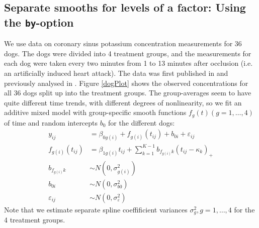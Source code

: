 \documentclass[12pt]{article}
\newcommand{\eps}{\varepsilon}
\newcommand{\sigmaeps} {\sigma^2_{\eps}}
\begin{document}
\clearpage
\subsection{Separate smooths for levels of a factor: Using the \texttt{by}-option}\label{ExBy}
We use data on coronary sinus potassium concentration measurements for 36 dogs.
The dogs were divided into 4 treatment groups, and the measurements for each dog
were taken every two minutes from 1 to 13 minutes after occlusion (i.e. an
artificially induced heart attack). The data was first published in
\cite{Grizzle:1969} and previously analysed in \cite{Crainiceanu:2005}. Figure
\ref{dogPlot} shows the observed concentrations for all 36 dogs split up into the
treatment groups. The group-averages seem to have quite different time trends,
with different degrees of nonlinearity, so we fit an additive mixed model with
group-specific smooth functions $f_{g}(t) (g=1,\dots,4)$ of time and random
intercepts $b_0$ for the different dogs:
\begin{align*}
y_{ij} &= \beta_{0g(i)} +  f_{g(i)}(t_{ij}) + b_{0i} + \eps_{ij}\\
f_{g(i)}(t_{ij}) &= \beta_{1g(i)} t_{ij} + \sum_{k=1}^{K-1} b_{f_{g(i)}k}(t_{ij}- \kappa_k)_+ \\
b_{f_{g(i)}k} &\sim N(0, \sigma^2_{g(i)}) \\
b_{0i} &\sim N(0, \sigma^2_{b0}) \\
\eps_{ij} &\sim N(0, \sigmaeps) 
\end{align*}
Note that we estimate separate spline coeffificient variances  $\sigma^2_{g}, g=1,\dots,4$ 
for the 4 treatment groups.
\end{document}
